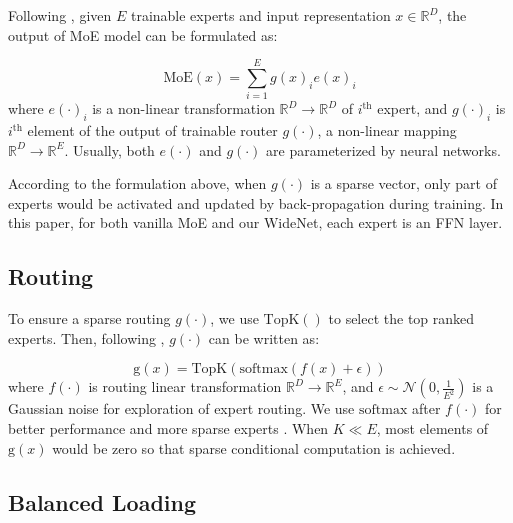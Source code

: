 \documentclass[letterpaper]{article} %
\begin{document}
Following \citet{shazeer2017outrageously}, given $E$ trainable experts and input representation $x\in \mathbb{R}^D$, the output of MoE model can be formulated as:

\begin{equation}
\mathrm{MoE}(x)=\sum_{i=1}^E {g(x)}_i {e(x)}_i
\end{equation}
where ${e(\cdot)}_i$ is a non-linear transformation $\mathbb{R}^D \to \mathbb{R}^D$ of $i^{\mathrm{th}}$ expert, and ${g(\cdot)}_i$ is $i^{\mathrm{th}}$ element of the output of trainable router $g(\cdot)$, a non-linear mapping $\mathbb{R}^D \to \mathbb{R}^E$. Usually, both $e(\cdot)$ and $g(\cdot)$ are parameterized by neural networks. 

According to the formulation above, when $g(\cdot)$ is a sparse vector, only part of experts would be activated and updated by back-propagation during training. In this paper, for both vanilla MoE and our WideNet, each expert is an FFN layer.


%


\subsection{Routing}

To ensure a sparse routing $g(\cdot)$, we use $\mathrm{TopK}()$ to select the top ranked experts. Then, following \citet{riquelme2021scaling}, $g(\cdot)$ can be written as:

\begin{equation}\label{eq:topK}
\mathrm{g}(x)=\mathrm{TopK}(\mathrm{softmax}(f(x)+\epsilon))
\end{equation}
where $f(\cdot)$ is routing linear transformation $\mathbb{R}^D \to \mathbb{R}^E$, and $\epsilon \sim \mathcal{N}(0,\frac{1}{E^2})$ is a Gaussian noise for exploration of expert routing. We use $\mathrm{softmax}$ after $f(\cdot)$ for better performance and more sparse experts \citep{riquelme2021scaling,fedus2021switch}. When $K \ll E$, most elements of $\mathrm{g}(x)$ would be zero so that sparse conditional computation is achieved. 



\subsection{Balanced Loading}
\end{document}
